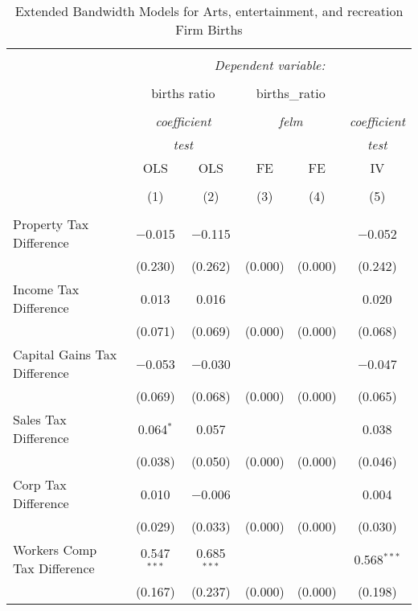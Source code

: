 
\begin{table}[!htbp] \centering 
  \caption{Extended Bandwidth Models for  Arts, entertainment, and recreation Firm Births} 
  \label{} 
\begin{tabular}{@{\extracolsep{5pt}}lccccc} 
\\[-1.8ex]\hline 
\hline \\[-1.8ex] 
 & \multicolumn{5}{c}{\textit{Dependent variable:}} \\ 
\cline{2-6} 
\\[-1.8ex] & \multicolumn{2}{c}{births ratio} & \multicolumn{2}{c}{births\_ratio} &   \\ 
\\[-1.8ex] & \multicolumn{2}{c}{\textit{coefficient}} & \multicolumn{2}{c}{\textit{felm}} & \textit{coefficient} \\ 
 & \multicolumn{2}{c}{\textit{test}} & \multicolumn{2}{c}{\textit{}} & \textit{test} \\ 
 & OLS & OLS & FE & FE & IV \\ 
\\[-1.8ex] & (1) & (2) & (3) & (4) & (5)\\ 
\hline \\[-1.8ex] 
 Property Tax Difference & $-$0.015 & $-$0.115 &  &  & $-$0.052 \\ 
  & (0.230) & (0.262) & (0.000) & (0.000) & (0.242) \\ 
  Income Tax Difference & 0.013 & 0.016 &  &  & 0.020 \\ 
  & (0.071) & (0.069) & (0.000) & (0.000) & (0.068) \\ 
  Capital Gains Tax Difference & $-$0.053 & $-$0.030 &  &  & $-$0.047 \\ 
  & (0.069) & (0.068) & (0.000) & (0.000) & (0.065) \\ 
  Sales Tax Difference & 0.064$^{*}$ & 0.057 &  &  & 0.038 \\ 
  & (0.038) & (0.050) & (0.000) & (0.000) & (0.046) \\ 
  Corp Tax Difference & 0.010 & $-$0.006 &  &  & 0.004 \\ 
  & (0.029) & (0.033) & (0.000) & (0.000) & (0.030) \\ 
  Workers Comp Tax Difference & 0.547$^{***}$ & 0.685$^{***}$ &  &  & 0.568$^{***}$ \\ 
  & (0.167) & (0.237) & (0.000) & (0.000) & (0.198) \\ 

\end{tabular}
\end{table}
